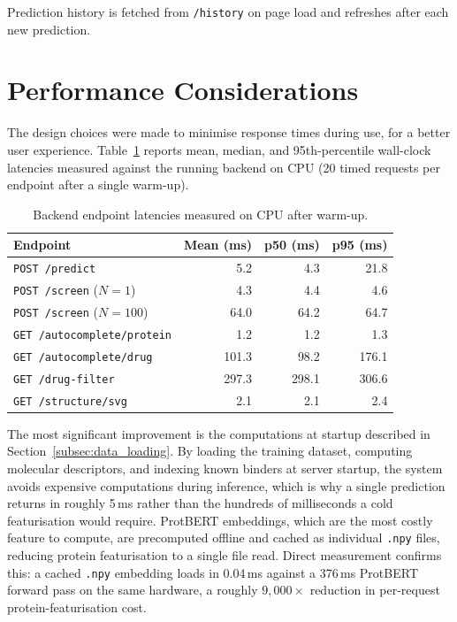 Prediction history is fetched from \texttt{/history} on page load and refreshes after each new prediction.

\section{Performance Considerations}
The design choices were made to minimise response times during use, for a better user experience.
Table~\ref{tab:endpoint_latency} reports mean, median, and 95th-percentile wall-clock latencies measured against the running backend on CPU (20 timed requests per endpoint after a single warm-up).

\begin{table}[H]
    \centering
    \begin{tabular}{lrrr}
        \toprule
        Endpoint & Mean (ms) & p50 (ms) & p95 (ms) \\
        \midrule
        \texttt{POST /predict}              & 5.2   & 4.3   & 21.8  \\
        \texttt{POST /screen} ($N=1$)       & 4.3   & 4.4   & 4.6   \\
        \texttt{POST /screen} ($N=100$)     & 64.0  & 64.2  & 64.7  \\
        \texttt{GET\ /autocomplete/protein} & 1.2   & 1.2   & 1.3   \\
        \texttt{GET\ /autocomplete/drug}    & 101.3 & 98.2  & 176.1 \\
        \texttt{GET\ /drug-filter}          & 297.3 & 298.1 & 306.6 \\
        \texttt{GET\ /structure/svg}        & 2.1   & 2.1   & 2.4   \\
        \bottomrule
    \end{tabular}
    \caption{Backend endpoint latencies measured on CPU after warm-up.}
    \label{tab:endpoint_latency}
\end{table}

The most significant improvement is the computations at startup described in Section~\ref{subsec:data_loading}.
By loading the training dataset, computing molecular descriptors, and indexing known binders at server startup, the system avoids expensive computations during inference, which is why a single prediction returns in roughly 5\,ms rather than the hundreds of milliseconds a cold featurisation would require.
ProtBERT embeddings, which are the most costly feature to compute, are precomputed offline and cached as individual \texttt{.npy} files, reducing protein featurisation to a single file read.
Direct measurement confirms this: a cached \texttt{.npy} embedding loads in 0.04\,ms against a 376\,ms ProtBERT forward pass on the same hardware, a roughly $9{,}000\times$ reduction in per-request protein-featurisation cost.

